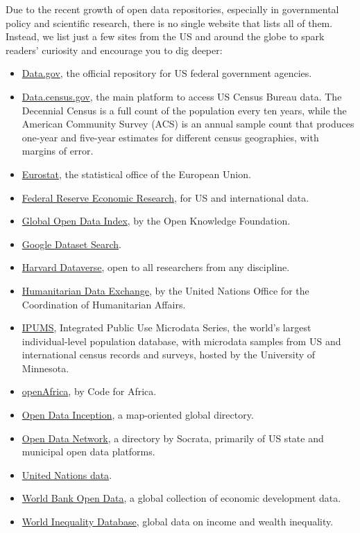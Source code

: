 \documentclass[
  english,
]{book}
\providecommand{\tightlist}{%
  \setlength{\itemsep}{0pt}\setlength{\parskip}{0pt}}
\begin{document}
Due to the recent growth of open data repositories, especially in governmental policy and scientific research, there is no single website that lists all of them. Instead, we list just a few sites from the US and around the globe to spark readers' curiosity and encourage you to dig deeper:

\begin{itemize}
\tightlist
\item
  \href{https://www.data.gov/}{Data.gov}, the official repository for US federal government agencies.
\item
  \href{https://data.census.gov}{Data.census.gov}, the main platform to access US Census Bureau data. The Decennial Census is a full count of the population every ten years, while the American Community Survey (ACS) is an annual sample count that produces one-year and five-year estimates for different census geographies, with margins of error.
\item
  \href{https://ec.europa.eu/eurostat}{Eurostat}, the statistical office of the European Union.
\item
  \href{https://fred.stlouisfed.org/}{Federal Reserve Economic Research}, for US and international data.
\item
  \href{https://index.okfn.org/dataset/}{Global Open Data Index}, by the Open Knowledge Foundation.
\item
  \href{https://datasetsearch.research.google.com/}{Google Dataset Search}.
\item
  \href{https://dataverse.harvard.edu}{Harvard Dataverse}, open to all researchers from any discipline.
\item
  \href{https://data.humdata.org}{Humanitarian Data Exchange}, by the United Nations Office for the Coordination of Humanitarian Affairs.
\item
  \href{https://www.ipums.org}{IPUMS}, Integrated Public Use Microdata Series, the world's largest individual-level population database, with microdata samples from US and international census records and surveys, hosted by the University of Minnesota.
\item
  \href{https://africaopendata.org/}{openAfrica}, by Code for Africa.
\item
  \href{https://opendatainception.io/}{Open Data Inception}, a map-oriented global directory.
\item
  \href{https://www.opendatanetwork.com/}{Open Data Network}, a directory by Socrata, primarily of US state and municipal open data platforms.
\item
  \href{https://data.un.org/}{United Nations data}.
\item
  \href{https://data.worldbank.org/}{World Bank Open Data}, a global collection of economic development data.
\item
  \href{https://wid.world/}{World Inequality Database}, global data on income and wealth inequality.
\end{itemize}
\end{document}
